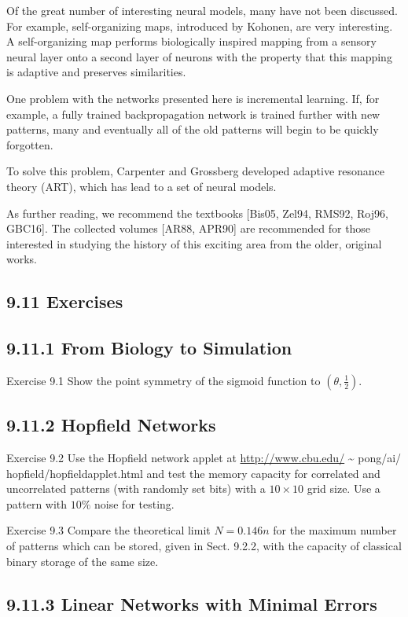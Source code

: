 \documentclass[10pt]{article}
\begin{document}
Of the great number of interesting neural models, many have not been discussed. For example, self-organizing maps, introduced by Kohonen, are very interesting. A self-organizing map performs biologically inspired mapping from a sensory neural layer onto a second layer of neurons with the property that this mapping is adaptive and preserves similarities.

One problem with the networks presented here is incremental learning. If, for example, a fully trained backpropagation network is trained further with new patterns, many and eventually all of the old patterns will begin to be quickly forgotten.

To solve this problem, Carpenter and Grossberg developed adaptive resonance theory (ART), which has lead to a set of neural models.

As further reading, we recommend the textbooks [Bis05, Zel94, RMS92, Roj96, GBC16]. The collected volumes [AR88, APR90] are recommended for those interested in studying the history of this exciting area from the older, original works.

\subsection*{9.11 Exercises}
\subsection*{9.11.1 From Biology to Simulation}
Exercise 9.1 Show the point symmetry of the sigmoid function to $\left(\theta, \frac{1}{2}\right)$.

\subsection*{9.11.2 Hopfield Networks}
Exercise 9.2 Use the Hopfield network applet at \href{http://www.cbu.edu/}{http://www.cbu.edu/} \~{} pong/ai/ hopfield/hopfieldapplet.html and test the memory capacity for correlated and uncorrelated patterns (with randomly set bits) with a $10 \times 10$ grid size. Use a pattern with $10 \%$ noise for testing.

Exercise 9.3 Compare the theoretical limit $N=0.146 n$ for the maximum number of patterns which can be stored, given in Sect. 9.2.2, with the capacity of classical binary storage of the same size.

\subsection*{9.11.3 Linear Networks with Minimal Errors}
\end{document}
